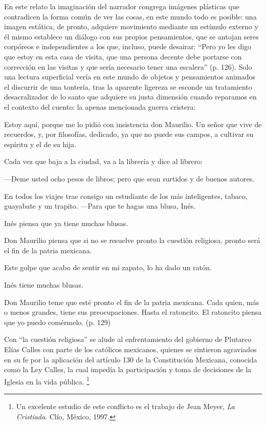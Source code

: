 \documentclass[14pt,twoside,final]{extbook} %
\let\oldfootnote\footnote
\renewcommand\footnote[1]{%
\oldfootnote{\hspace{1mm}#1}}
\begin{document}
En este relato la imaginación del narrador congrega imágenes plásticas que contradicen la forma común de ver las cosas, en este mundo todo es posible: una imagen estática, de pronto, adquiere movimiento mediante un estímulo externo y él mismo establece un diálogo con sus propios pensamientos, que se antojan seres corpóreos e independientes a los que, incluso, puede desairar: ``Pero yo les digo que estoy en esta casa de visita, que una persona decente debe portarse con corrección en las visitas y que sería necesario tener una escalera'' (p. 126). Solo una lectura superficial vería en este mundo de objetos y pensamientos animados el discurrir de una tontería, tras la aparente ligereza se esconde un tratamiento desacralizador de lo santo que adquiere su justa dimensión cuando reparamos en el contexto del cuento: la apenas mencionada guerra cristera:
\begin{quoting}
Estoy aquí, porque me lo pidió con insistencia don Maurilio. Un señor que vive de recuerdos, y, por filosofías, dedicado, ya que no puede sus campos, a cultivar su espíritu y el de su hija.

Cada vez que baja a la ciudad, va a la librería y dice al librero:

---Deme usted ocho pesos de libros; pero que sean surtidos y de buenos autores.

En todos los viajes trae consigo un estudiante de los más inteligentes, tabaco, guayabate y un trapito. ---Para que te hagas una blusa, Inés.

Inés piensa que ya tiene muchas blusas.

Don Maurilio piensa que si no se resuelve pronto la cuestión religiosa, pronto será el fin de la patria mexicana.

Este golpe que acabo de sentir en mi zapato, lo ha dado un ratón.

Inés tiene muchas blusas.

Don Maurilio teme que esté pronto el fin de la patria mexicana. Cada quien, más o menos grandes, tiene sus preocupaciones. Hasta el ratoncito. El ratoncito piensa que yo puedo comérmelo. (p. 129)
\end{quoting}
Con ``la cuestión religiosa'' se alude al enfrentamiento del gobierno de Plutarco Elías Calles con parte de los católicos mexicanos, quienes se sintieron agraviados en su fe por la aplicación del artículo 130 de la Constitución Mexicana, conocida como la Ley Calles, la cual impedía la participación y toma de decisiones de la Iglesia en la vida pública.\footnote{Un excelente estudio de este conflicto es el trabajo de Jean Meyer, \emph{La Cristiada}. Clío, México, 1997.}
\end{document}
